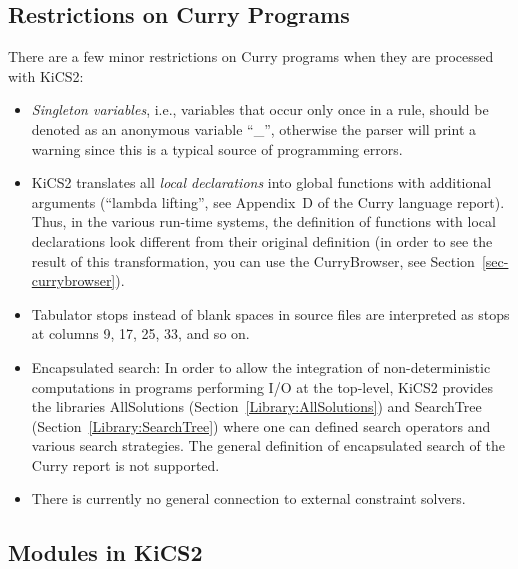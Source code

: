 \documentclass[11pt,fleqn]{article}
\renewcommand{\tt}{\usefont{OT1}{cmtt}{m}{n}\selectfont}
\newcommand{\codefont}{\tt}
\newcommand{\code}[1]{\mbox{\codefont #1}}
\newcommand{\ccode}[1]{``\mbox{\codefont #1}''}
\newcommand{\cb}{CurryBrowser\xspace}
\begin{document}
\subsection{Restrictions on Curry Programs}
\label{sec-restrictions}

There are a few minor restrictions on Curry programs
when they are processed with KiCS2:
\begin{itemize}
\item {}
\emph{Singleton variables}, i.e., variables that occur only once
in a rule, should be denoted as an anonymous variable \ccode{_},
otherwise the parser will print a warning since this is a
typical source of programming errors.
\item
KiCS2 translates all \emph{local declarations} into global functions with
additional arguments (``lambda lifting'', see Appendix~D of the
Curry language report).
Thus, in the various run-time systems, the definition of
functions with local declarations look different from
their original definition (in order to see the result
of this transformation, you can use the \cb, see
Section~\ref{sec-currybrowser}).
\item {}
Tabulator stops instead of blank spaces in source files are
interpreted as stops at columns 9, 17, 25, 33, and so on.
\item
Encapsulated search: In order
to allow the integration of non-deterministic computations
in programs performing I/O at the top-level, KiCS2 provides
the libraries \code{AllSolutions} (Section~\ref{Library:AllSolutions})
and \code{SearchTree} (Section~\ref{Library:SearchTree})
where one can defined search operators and various search strategies.
The general definition of encapsulated search of the Curry report
\cite{HanusSteiner98PLILP} is not supported.
\item
There is currently no general connection to external constraint solvers.
\end{itemize}


\subsection{Modules in KiCS2}
\label{sec-modules}
\end{document}
